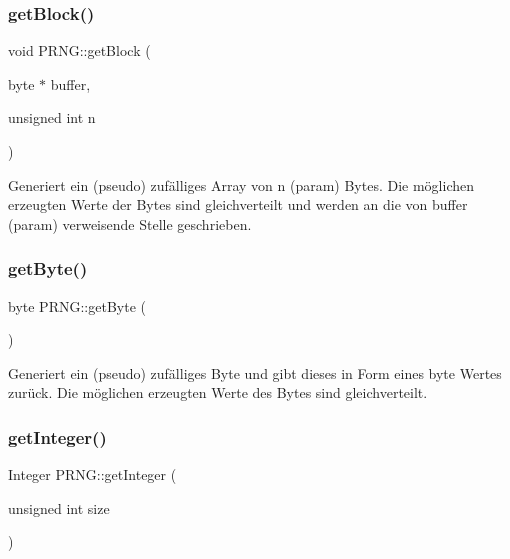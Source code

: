 \mbox{\label{classPRNG_a1b48ca02baade80760485574d2a84644}} 
\subsubsection{\texorpdfstring{get\+Block()}{getBlock()}}
{\footnotesize\ttfamily void P\+R\+N\+G\+::get\+Block (\begin{DoxyParamCaption}\item[{byte $\ast$}]{buffer,  }\item[{unsigned int}]{n }\end{DoxyParamCaption})\hspace{0.3cm}{\ttfamily [virtual]}}

Generiert ein (pseudo) zufälliges Array von n (param) Bytes. Die möglichen erzeugten Werte der Bytes sind gleichverteilt und werden an die von \textquotesingle{}buffer\textquotesingle{} (param) verweisende Stelle geschrieben. \mbox{\label{classPRNG_aaef8a8a16c7a871a85262e26a19b9048}} 
\subsubsection{\texorpdfstring{get\+Byte()}{getByte()}}
{\footnotesize\ttfamily byte P\+R\+N\+G\+::get\+Byte (\begin{DoxyParamCaption}{ }\end{DoxyParamCaption})\hspace{0.3cm}{\ttfamily [virtual]}}

Generiert ein (pseudo) zufälliges Byte und gibt dieses in Form eines byte Wertes zurück. Die möglichen erzeugten Werte des Bytes sind gleichverteilt. \mbox{\label{classPRNG_aee67ebb332e0336b2dceefb6bba726db}} 
\subsubsection{\texorpdfstring{get\+Integer()}{getInteger()}\hspace{0.1cm}{\footnotesize\ttfamily [1/2]}}
{\footnotesize\ttfamily Integer P\+R\+N\+G\+::get\+Integer (\begin{DoxyParamCaption}\item[{unsigned int}]{size }\end{DoxyParamCaption})\hspace{0.3cm}{\ttfamily [virtual]}}

